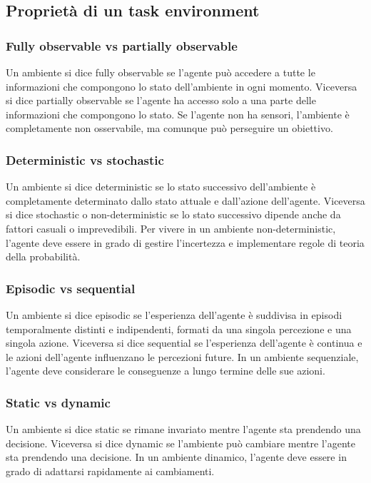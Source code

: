 \subsection{Proprietà di un task environment}
\subsubsection*{Fully observable vs partially observable}
Un ambiente si dice fully observable se l'agente può accedere a tutte le informazioni che compongono lo stato dell'ambiente in
ogni momento. Viceversa si dice partially observable se l'agente ha accesso solo a una parte delle informazioni che compongono
lo stato. Se l'agente non ha sensori, l'ambiente è completamente non osservabile, ma comunque può perseguire un obiettivo.

\subsubsection*{Deterministic vs stochastic}
Un ambiente si dice deterministic se lo stato successivo dell'ambiente è completamente determinato dallo stato attuale e
dall'azione dell'agente. Viceversa si dice stochastic o non-deterministic se lo stato successivo dipende anche da fattori
casuali o imprevedibili. Per vivere in un ambiente non-deterministic, l'agente deve essere in grado di gestire l'incertezza
e implementare regole di teoria della probabilità. 

\subsubsection*{Episodic vs sequential}
Un ambiente si dice episodic se l'esperienza dell'agente è suddivisa in episodi temporalmente distinti e indipendenti, formati
da una singola percezione e una singola azione. Viceversa si dice sequential se l'esperienza dell'agente è continua e le
azioni dell'agente influenzano le percezioni future. In un ambiente sequenziale, l'agente deve considerare le conseguenze a
lungo termine delle sue azioni.

\subsubsection*{Static vs dynamic}
Un ambiente si dice static se rimane invariato mentre l'agente sta prendendo una decisione. Viceversa si dice dynamic se
l'ambiente può cambiare mentre l'agente sta prendendo una decisione. In un ambiente dinamico, l'agente deve essere in grado
di adattarsi rapidamente ai cambiamenti.

